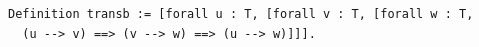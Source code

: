 \begin{lstlisting}[language=Rocq]
Definition transb := [forall u : T, [forall v : T, [forall w : T,
  (u --> v) ==> (v --> w) ==> (u --> w)]]].
\end{lstlisting}
